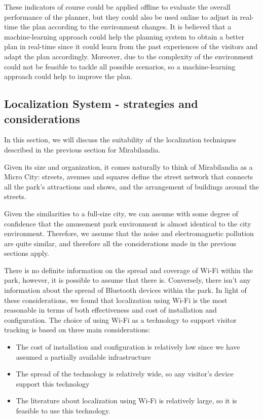 These indicators of course could be applied offline to evaluate the overall performance of the planner, but they could also be used online to adjust
in real-time the plan according to the environment changes. It is believed that a machine-learning approach could help the planning system to obtain
a better plan in real-time since it could learn from the past experiences of the visitors and adapt the plan accordingly. Moreover, due to the
complexity of the environment could not be feasible to tackle all possible scenarios, so a machine-learning approach could help to improve the plan.

\subsection{Localization System - strategies and considerations}
In this section, we will discuss the suitability of the localization techniques described in the previous section for Mirabilandia.

Given its size and organization, it comes naturally to think of Mirabilandia as a Micro City: streets, avenues and squares define the street network
that connects all the park's attractions and shows, and the arrangement of buildings around the streets.

Given the similarities to a full-size city, we can assume with some degree of confidence that the amusement park environment is almost identical to
the city environment. Therefore, we assume that the noise and electromagnetic pollution are quite similar, and therefore all the considerations made
in the previous sections apply.

There is no definite information on the spread and coverage of Wi-Fi within the park, however, it is possible to assume that there is. Conversely, there isn't any information about the spread of Bluetooth devices within the park.
In light of these considerations, we found that localization using
Wi-Fi is the most reasonable in terms of both effectiveness and cost of installation and configuration. The choice of using Wi-Fi as a technology to
support visitor tracking is based on three main considerations:

\begin{itemize}
	\item The cost of installation and configuration is relatively low since we have assumed a partially available infrastructure
	\item The spread of the technology is relatively wide, so any visitor's device support this technology
	\item The literature about localization using Wi-Fi is relatively large, so it is feasible to use this technology.
\end{itemize}


